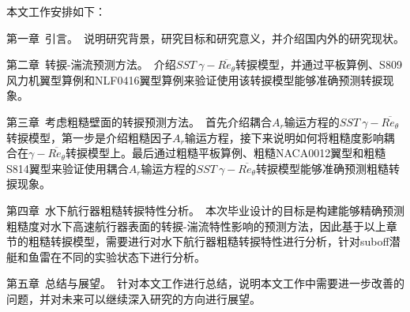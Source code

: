 本文工作安排如下：

第一章~引言。~说明研究背景，研究目标和研究意义，并介绍国内外的研究现状。

第二章~转捩-湍流预测方法。~介绍$SST~\gamma-\overline{Re_\theta}$转捩模型，并通过平板算例、S809风力机翼型算例和NLF0416翼型算例来验证使用该转捩模型能够准确预测转捩现象。

第三章~考虑粗糙壁面的转捩预测方法。~首先介绍耦合$A_r$输运方程的$SST~\gamma-\overline{Re_\theta}$转捩模型，第一步是介绍粗糙因子$A_r$输运方程，接下来说明如何将粗糙度影响耦合在$\gamma-\overline{Re_\theta}$转捩模型上。最后通过粗糙平板算例、粗糙NACA0012翼型和粗糙S814翼型来验证使用耦合$A_r$输运方程的$SST~\gamma-\overline{Re_\theta}$转捩模型能够准确预测粗糙转捩现象。

第四章~水下航行器粗糙转捩特性分析。~本次毕业设计的目标是构建能够精确预测粗糙度对水下高速航行器表面的转捩-湍流特性影响的预测方法，因此基于以上章节的粗糙转捩模型，需要进行对水下航行器粗糙转捩特性进行分析，针对suboff潜艇和鱼雷在不同的实验状态下进行分析。

第五章~总结与展望。~针对本文工作进行总结，说明本文工作中需要进一步改善的问题，并对未来可以继续深入研究的方向进行展望。

\clearpage
\endinput